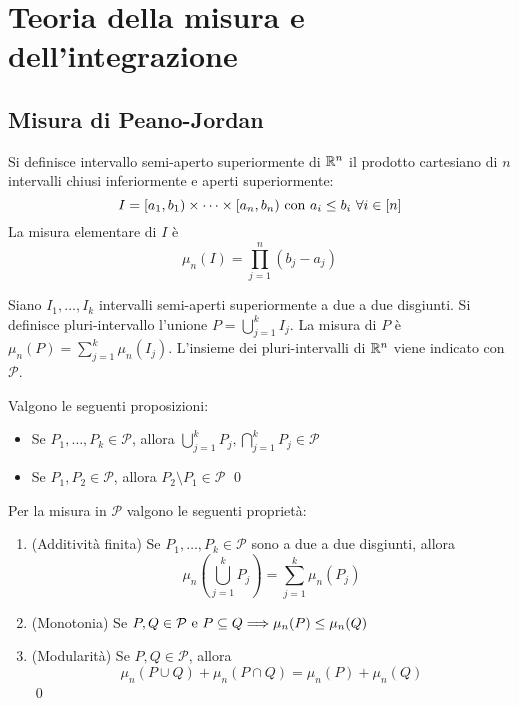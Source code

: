 \chapter{Teoria della misura e dell'integrazione}

\section{Misura di Peano-Jordan}

\begin{definition}
    Si definisce intervallo semi-aperto superiormente di $\mathbb{R}^n$ il prodotto cartesiano di $n$ intervalli chiusi inferiormente e aperti superiormente:
    $$
        I=[a_1,b_1)\times\cdots\times[a_n,b_n) \text{ con } a_i \leq b_i \ \forall i \in [n]
    $$
    La misura elementare di $I$ è
    $$
        \mu_n(I)=\prod_{j=1}^n(b_j-a_j)
    $$
\end{definition}

\begin{definition}
    Siano $I_1,\dots,I_k$ intervalli semi-aperti superiormente a due a due disgiunti. Si definisce pluri-intervallo l'unione $\displaystyle P=\bigcup_{j=1}^kI_j$. La misura di $P$ è $\mu_n(P)=\displaystyle \sum_{j=1}^k\mu_n(I_j)$. 
    L'insieme dei pluri-intervalli di $\mathbb{R}^n$ viene indicato con $\mathcal{P}$.
\end{definition}

\begin{lemma}
    Valgono le seguenti proposizioni:
    \begin{itemize}
        \item Se $P_1,\dots,P_k \in \mathcal{P}$, allora $\displaystyle \bigcup_{j=1}^k P_j, \bigcap_{j=1}^kP_j \in \mathcal{P}$
        \item Se $P_1,P_2 \in \mathcal{P}$, allora $P_2 \setminus P_1 \in \mathcal{P}$
        \qed
    \end{itemize}
\end{lemma}

\begin{theorem}
    Per la misura in $\mathcal{P}$ valgono le seguenti proprietà:
    \begin{enumerate}
        \item (Additività finita) Se $P_1,\dots,P_k \in \mathcal{P}$ sono a due a due disgiunti, allora
        $$
            \mu_n\left( \bigcup_{j=1}^k P_j \right) = \sum_{j=1}^k \mu_n(P_j)
        $$
        \item (Monotonia) Se $P, Q \in \mathcal{P} \text{ e } P \subseteq Q \Longrightarrow \mu_n(P)\leq \mu_n(Q)$
        \item (Modularità) Se $P,Q \in \mathcal{P}$, allora
        $$
            \mu_n(P\cup Q) + \mu_n (P \cap Q) = \mu_n (P) + \mu_n (Q)
        $$
        \qed
    \end{enumerate}
\end{theorem}

